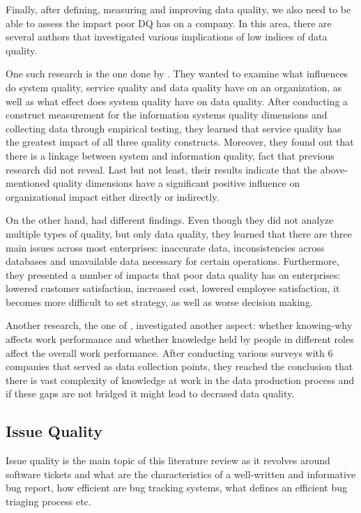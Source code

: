 \documentclass{mprop}
\begin{document}
Finally, after defining, measuring and improving data quality, we also need
to be able to assess the impact poor DQ has on a company. In this area, there
are several authors that investigated various implications of low indices
of data quality.

One such research is the one done by \citet{gorla2010organizational}. They wanted
to examine what influences do system quality, service quality and data quality
have on an organization, as well as what effect does system quality have on
data quality. After conducting a construct measurement for the information
systems quality dimensions \citep{swanson1997maintaining} and collecting data
through empirical testing, they learned that service quality has the greatest
impact of all three quality constructs. Moreover, they found out that there is 
a linkage between system and information quality, fact that previous research
did not reveal. Last but not least, their results indicate that the 
above-mentioned quality dimensions have a significant positive influence on 
organizational impact either directly or indirectly. 

On the other hand, \citet{redman1998impact} had different findings. Even though
they did not analyze multiple types of quality, but only data quality, they 
learned that there are three main issues across most enterprises: inaccurate
data, inconsistencies across databases and unavailable data necessary for 
certain operations. Furthermore, they presented a number of impacts that
poor data quality has on enterprises: lowered customer satisfaction, increased
cost, lowered employee satisfaction, it becomes more difficult to set strategy,
as well as worse decision making.

Another research, the one of \citet{lee2003knowing}, investigated another 
aspect: whether knowing-why affects work performance and whether knowledge held
by people in different roles affect the overall work performance. After
conducting various surveys with 6 companies that served as data collection 
points, they reached the conclusion that there is vast complexity of 
knowledge at work in the data production process and if these gaps are not 
bridged it might lead to decrased data quality.

\subsection{Issue Quality}

Issue quality is the main topic of this literature review as it revolves around
software tickets and what are the characteristics of a well-written and 
informative bug report, how efficient are bug tracking systems, what defines
an efficient bug triaging process etc. 
\end{document}
